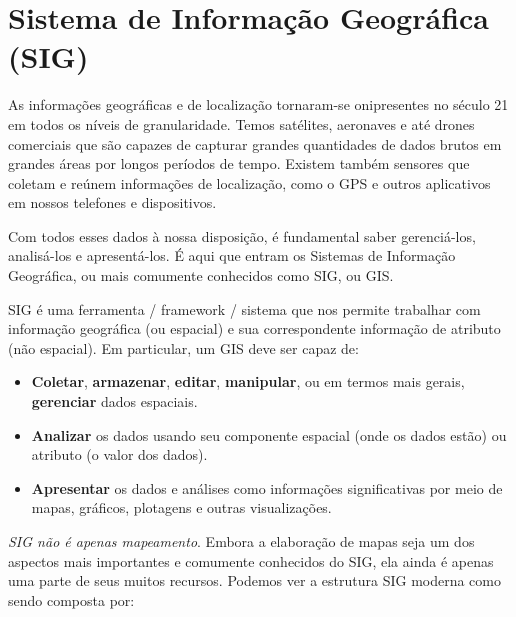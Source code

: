 \documentclass[
  portuguese,
]{krantz}
\providecommand{\tightlist}{%
  \setlength{\itemsep}{0pt}\setlength{\parskip}{0pt}}
\begin{document}
\hypertarget{sistema-de-informauxe7uxe3o-geogruxe1fica-sig}{%
\section{Sistema de Informação Geográfica (SIG)}\label{sistema-de-informauxe7uxe3o-geogruxe1fica-sig}}

As informações geográficas e de localização tornaram-se onipresentes no século 21 em todos os níveis de granularidade. Temos satélites, aeronaves e até drones comerciais que são capazes de capturar grandes quantidades de dados brutos em grandes áreas por longos períodos de tempo. Existem também sensores que coletam e reúnem informações de localização, como o GPS e outros aplicativos em nossos telefones e dispositivos.

Com todos esses dados à nossa disposição, é fundamental saber gerenciá-los, analisá-los e apresentá-los. É aqui que entram os Sistemas de Informação Geográfica, ou mais comumente conhecidos como SIG, ou GIS.

SIG é uma ferramenta / framework / sistema que nos permite trabalhar com informação geográfica (ou espacial) e sua correspondente informação de atributo (não espacial). Em particular, um GIS deve ser capaz de:

\begin{itemize}
\tightlist
\item
  \textbf{Coletar}, \textbf{armazenar}, \textbf{editar}, \textbf{manipular}, ou em termos mais gerais, \textbf{gerenciar} dados espaciais.
\item
  \textbf{Analizar} os dados usando seu componente espacial (onde os dados estão) ou atributo (o valor dos dados).
\item
  \textbf{Apresentar} os dados e análises como informações significativas por meio de mapas, gráficos, plotagens e outras visualizações.
\end{itemize}

\emph{SIG não é apenas mapeamento}. Embora a elaboração de mapas seja um dos aspectos mais importantes e comumente conhecidos do SIG, ela ainda é apenas uma parte de seus muitos recursos. Podemos ver a estrutura SIG moderna como sendo composta por:
\end{document}

